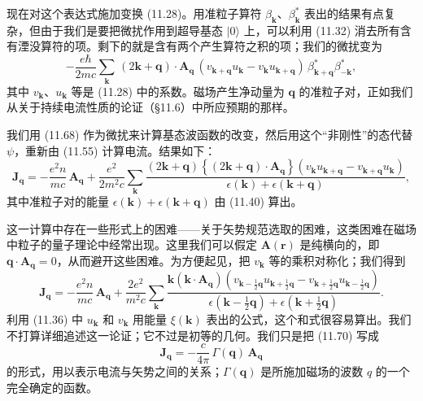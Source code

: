 现在对这个表达式施加变换 (11.28)。用准粒子算符 $\beta_{\mathbf{k}}$、$\beta_{\mathbf{k}}^{*}$ 表出的结果有点复杂，但由于我们是要把微扰作用到超导基态 $|0\rangle$ 上，可以利用 (11.32) 消去所有含有湮没算符的项。剩下的就是含有两个产生算符之积的项；我们的微扰变为
\begin{equation*}
-\frac{e\hbar}{2mc}\sum_{\mathbf{k}}\,(2\mathbf{k}+\mathbf{q})\cdot\mathbf{A}_{\mathbf{q}}\,(v_{\mathbf{k}+\mathbf{q}}u_{\mathbf{k}} - v_{\mathbf{k}}u_{\mathbf{k}+\mathbf{q}})\,\beta_{\mathbf{k}+\mathbf{q}}^{*}\beta_{-\mathbf{k}}^{*}, \tag{11.68}
\end{equation*}
其中 $v_{\mathbf{k}}$、$u_{\mathbf{k}}$ 等是 (11.28) 中的系数。磁场产生净动量为 $\mathbf{q}$ 的准粒子对，正如我们从关于持续电流性质的论证（§11.6）中所应预期的那样。

我们用 (11.68) 作为微扰来计算基态波函数的改变，然后用这个“非刚性”的态代替 $\psi$，重新由 (11.55) 计算电流。结果如下：
\begin{equation*}
\mathbf{J}_{\mathbf{q}} = -\frac{e^{2}n}{mc}\,\mathbf{A}_{\mathbf{q}} + \frac{e^{2}}{2m^{2}c}\sum_{\mathbf{k}}\frac{(2\mathbf{k}+\mathbf{q})\left\{(2\mathbf{k}+\mathbf{q})\cdot\mathbf{A}_{\mathbf{q}}\right\}(v_{\mathbf{k}}u_{\mathbf{k}+\mathbf{q}} - v_{\mathbf{k}+\mathbf{q}}u_{\mathbf{k}})}{\epsilon(\mathbf{k})+\epsilon(\mathbf{k}+\mathbf{q})}, \tag{11.69}
\end{equation*}
其中准粒子对的能量 $\epsilon(\mathbf{k})+\epsilon(\mathbf{k}+\mathbf{q})$ 由 (11.40) 算出。

这一计算中存在一些形式上的困难——关于矢势规范选取的困难，这类困难在磁场中粒子的量子理论中经常出现。这里我们可以假定 $\mathbf{A}(\mathbf{r})$ 是纯横向的，即 $\mathbf{q}\cdot\mathbf{A}_{\mathbf{q}}=0$，从而避开这些困难。为方便起见，把 $v_{\mathbf{k}}$ 等的乘积对称化；我们得到
\begin{equation*}
\mathbf{J}_{\mathbf{q}} = -\frac{e^{2}n}{mc}\,\mathbf{A}_{\mathbf{q}} + \frac{2e^{2}}{m^{2}c}\sum_{\mathbf{k}}\frac{\mathbf{k}(\mathbf{k}\cdot\mathbf{A}_{\mathbf{q}})\left(v_{\mathbf{k}-\frac{1}{2}\mathbf{q}}u_{\mathbf{k}+\frac{1}{2}\mathbf{q}} - v_{\mathbf{k}+\frac{1}{2}\mathbf{q}}u_{\mathbf{k}-\frac{1}{2}\mathbf{q}}\right)}{\epsilon(\mathbf{k}-\frac{1}{2}\mathbf{q})+\epsilon(\mathbf{k}+\frac{1}{2}\mathbf{q})}. \tag{11.70}
\end{equation*}
利用 (11.36) 中 $u_{\mathbf{k}}$ 和 $v_{\mathbf{k}}$ 用能量 $\xi(\mathbf{k})$ 表出的公式，这个和式很容易算出。我们不打算详细追述这一论证；它不过是初等的几何。我们只是把 (11.70) 写成
\begin{equation*}
\mathbf{J}_{\mathbf{q}} = -\frac{c}{4\pi}\,\Gamma(\mathbf{q})\,\mathbf{A}_{\mathbf{q}} \tag{11.71}
\end{equation*}
的形式，用以表示电流与矢势之间的关系；$\Gamma(\mathbf{q})$ 是所施加磁场的波数 $q$ 的一个完全确定的函数。

